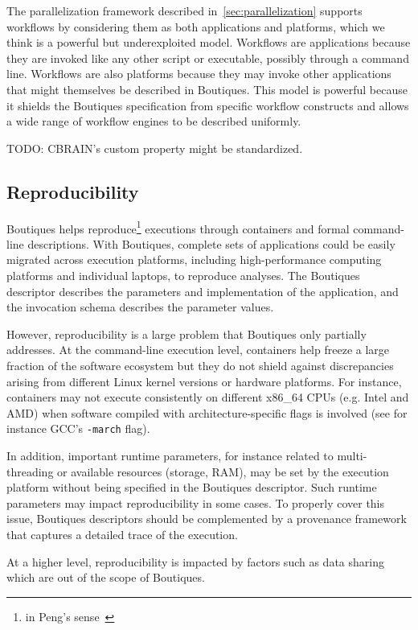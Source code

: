 \documentclass[a4paper,num-refs]{oup-contemporary}
\newcommand{\todo}[1]{\color{red}TODO: #1\color{black}}
\newcommand{\boutiques}{Boutiques\xspace}
\begin{document}
The parallelization framework described in~\ref{sec:parallelization}
supports workflows by considering them as both applications and
platforms, which we think is a powerful but underexploited
model. Workflows are applications because they are invoked like any
other script or executable, possibly through a command line. Workflows
are also platforms because they may invoke other applications that
might themselves be described in \boutiques. This model is powerful
because it shields the \boutiques specification from specific workflow
constructs and allows a wide range of workflow engines to be described
uniformly. 

\todo{CBRAIN's custom property might be standardized.}

\subsection{Reproducibility}

\boutiques helps reproduce\footnote{in Peng's
  sense~\cite{peng2011reproducible}} executions through containers and
formal command-line descriptions. With \boutiques, complete sets of
applications could be easily migrated across execution platforms,
including high-performance computing platforms and individual laptops,
to reproduce analyses. The \boutiques descriptor describes the
parameters and implementation of the application, and the invocation
schema describes the parameter values.

However, reproducibility is a large problem that \boutiques only
partially addresses. At the command-line execution level, containers
help freeze a large fraction of the software ecosystem but they do not
shield against discrepancies arising from different Linux kernel
versions or hardware platforms. For instance, containers may not
execute consistently on different x86\_64 CPUs (e.g. Intel and AMD)
when software compiled with architecture-specific flags is involved
(see for instance GCC's \texttt{-march} flag).

In addition, important runtime parameters, for instance related to
multi-threading or available resources (storage, RAM), may be set by
the execution platform without being specified in the \boutiques
descriptor. Such runtime parameters may impact reproducibility in some
cases. To properly cover this issue, \boutiques descriptors should be
complemented by a provenance framework that captures a detailed trace
of the execution.

At a higher level, reproducibility is impacted by factors
such as data sharing~\cite{poldrack2014making} which are out of the
scope of \boutiques.
\end{document}
